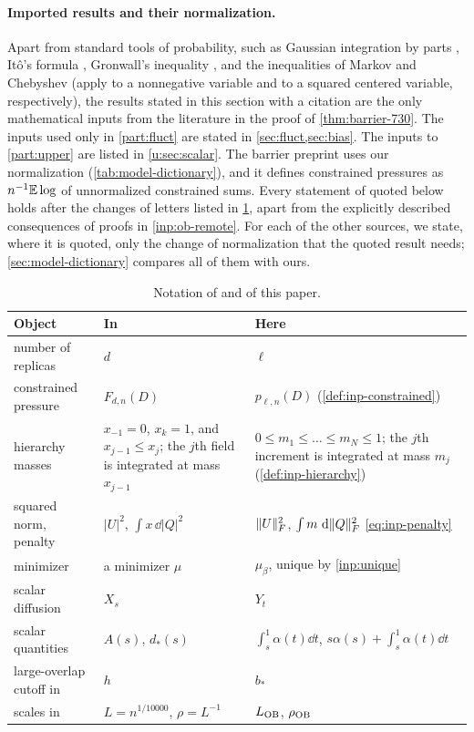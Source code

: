 \paragraph{Imported results and their normalization.}
Apart from standard tools of probability, such as Gaussian integration by
parts \cite[Section~A.4, (A.17)]{talagrand-2011}, It\^o's formula
\cite[Theorem~3.3.6]{karatzas-shreve-1991}, Gronwall's inequality
\cite[Section~A.13]{talagrand-2011}, and the inequalities of Markov and
Chebyshev (apply \cite[(A.7)]{talagrand-2011} to a nonnegative variable and to
a squared centered variable, respectively), the
results stated in this section with a citation are the only mathematical inputs
from the literature in the proof of \cref{thm:barrier-730}. The
inputs used only in \cref{part:fluct} are stated in \cref{sec:fluct,sec:bias}.
The inputs to \cref{part:upper} are listed in \cref{u:sec:scalar}.
The barrier preprint \cite{oai-barriers} uses our normalization
(\cref{tab:model-dictionary}), and it defines constrained pressures as
$n^{-1}\mathbb E\log$ of unnormalized constrained sums. Every statement of
\cite{oai-barriers} quoted below holds after the changes of letters listed in
\cref{tab:inp-ob}, apart from the explicitly described consequences of proofs
in \cref{inp:ob-remote}. For each of the other sources, we state, where it is
quoted, only the change of normalization that the quoted result needs;
\cref{sec:model-dictionary} compares all of them with ours.

\begin{table}[ht]
\centering
\small
\caption{Notation of \cite{oai-barriers} and of this paper.}\label{tab:inp-ob}
\begin{tabular}{@{}>{\raggedright\arraybackslash}p{}>{\raggedright\arraybackslash}p{}>{\raggedright\arraybackslash}p{}@{}}
\toprule
Object & In \cite{oai-barriers} & Here\\
\midrule
number of replicas & $d$ & $\ell$\\
constrained pressure & $F_{d,n}(D)$ & $p_{\ell,n}(D)$ (\cref{def:inp-constrained})\\
hierarchy masses & $x_{-1}=0$, $x_k=1$, and $x_{j-1}\le x_j$; the $j$th field is
  integrated at mass $x_{j-1}$ & $0\le m_1\le\dots\le m_N\le1$; the $j$th
  increment is integrated at mass $m_j$ (\cref{def:inp-hierarchy})\\
squared norm, penalty & $|U|^2$, $\int x\,\dd|Q|^2$ & $\lVert U\rVert_F^2$,
  $\int m\,\,\mathrm d\lVert Q\rVert_F^2$ \eqref{eq:inp-penalty}\\
minimizer & a minimizer $\mu$ & $\mu_\beta$, unique by \cref{inp:unique}\\
scalar diffusion & $X_s$ & $Y_t$\\
scalar quantities & $A(s)$, $d_*(s)$ & $\int_s^1\alpha(t)\dd t$,
  $s\alpha(s)+\int_s^1\alpha(t)\dd t$\\
large-overlap cutoff in \cite[Lemma~4.1 and (4.20)]{oai-barriers} & $h$ & $b_*$\\
scales in \cite[Sections~6--7]{oai-barriers} & $L=n^{1/10000}$, $\rho=L^{-1}$
  & $L_{\rm OB}$, $\rho_{\rm OB}$\\
\bottomrule
\end{tabular}
\end{table}

